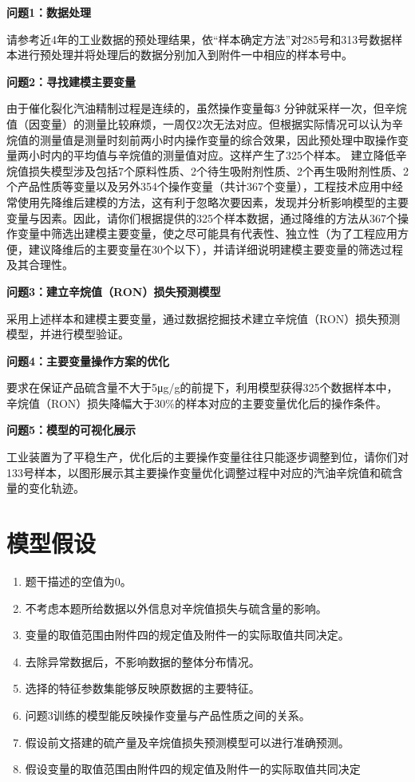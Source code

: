 \documentclass[bwprint]{gmcmthesis}
\begin{document}
\textbf{问题1：数据处理}

请参考近4年的工业数据的预处理结果，依“样本确定方法”对285号和313号数据样本进行预处理并将处理后的数据分别加入到附件一中相应的样本号中。


\textbf{问题2：寻找建模主要变量}

由于催化裂化汽油精制过程是连续的，虽然操作变量每3 分钟就采样一次，但辛烷值（因变量）的测量比较麻烦，一周仅2次无法对应。但根据实际情况可以认为辛烷值的测量值是测量时刻前两小时内操作变量的综合效果，因此预处理中取操作变量两小时内的平均值与辛烷值的测量值对应。这样产生了325个样本。
建立降低辛烷值损失模型涉及包括7个原料性质、2个待生吸附剂性质、2个再生吸附剂性质、2个产品性质等变量以及另外354个操作变量（共计367个变量），工程技术应用中经常使用先降维后建模的方法，这有利于忽略次要因素，发现并分析影响模型的主要变量与因素。因此，请你们根据提供的325个样本数据，通过降维的方法从367个操作变量中筛选出建模主要变量，使之尽可能具有代表性、独立性（为了工程应用方便，建议降维后的主要变量在30个以下），并请详细说明建模主要变量的筛选过程及其合理性。

\textbf{问题3：建立辛烷值（RON）损失预测模型}

采用上述样本和建模主要变量，通过数据挖掘技术建立辛烷值（RON）损失预测模型，并进行模型验证。

\textbf{问题4：主要变量操作方案的优化}

要求在保证产品硫含量不大于5μg/g的前提下，利用模型获得325个数据样本中，辛烷值（RON）损失降幅大于30\%的样本对应的主要变量优化后的操作条件。

\textbf{问题5：模型的可视化展示}

工业装置为了平稳生产，优化后的主要操作变量往往只能逐步调整到位，请你们对133号样本，以图形展示其主要操作变量优化调整过程中对应的汽油辛烷值和硫含量的变化轨迹。



\FloatBarrier
\section{模型假设}


\begin{enumerate}[itemindent=20pt]
	\item 题干描述的空值为0。
	\item 不考虑本题所给数据以外信息对辛烷值损失与硫含量的影响。
	\item 变量的取值范围由附件四的规定值及附件一的实际取值共同决定。
	\item 去除异常数据后，不影响数据的整体分布情况。
	\item 选择的特征参数集能够反映原数据的主要特征。
	\item 问题3训练的模型能反映操作变量与产品性质之间的关系。	
	\item 假设前文搭建的硫产量及辛烷值损失预测模型可以进行准确预测。
	\item 假设变量的取值范围由附件四的规定值及附件一的实际取值共同决定
\end{enumerate}
\end{document}
